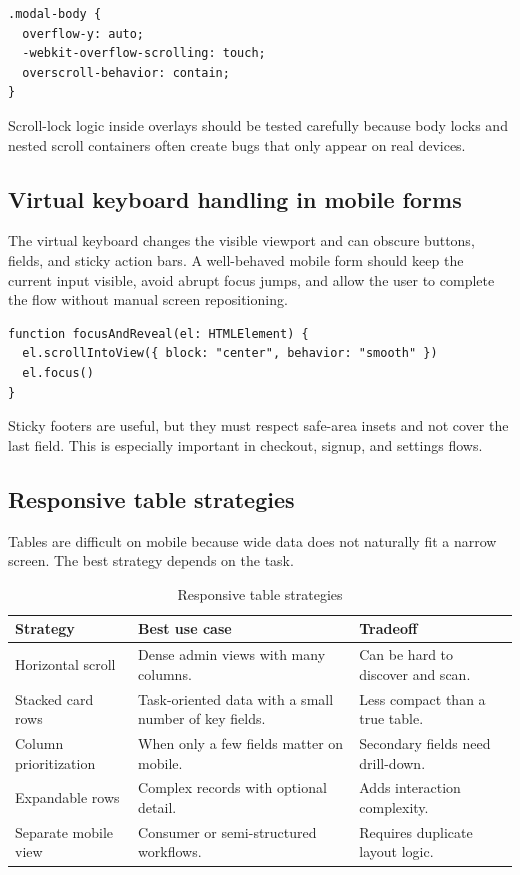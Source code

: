\begin{verbatim}
.modal-body {
  overflow-y: auto;
  -webkit-overflow-scrolling: touch;
  overscroll-behavior: contain;
}
\end{verbatim}

Scroll-lock logic inside overlays should be tested carefully because body locks and nested scroll containers often create bugs that only appear on real devices.

\subsection{Virtual keyboard handling in mobile forms}
The virtual keyboard changes the visible viewport and can obscure buttons, fields, and sticky action bars. A well-behaved mobile form should keep the current input visible, avoid abrupt focus jumps, and allow the user to complete the flow without manual screen repositioning.

\begin{verbatim}
function focusAndReveal(el: HTMLElement) {
  el.scrollIntoView({ block: "center", behavior: "smooth" })
  el.focus()
}
\end{verbatim}

Sticky footers are useful, but they must respect safe-area insets and not cover the last field. This is especially important in checkout, signup, and settings flows.

\subsection{Responsive table strategies}
Tables are difficult on mobile because wide data does not naturally fit a narrow screen. The best strategy depends on the task.

\begin{table}[htbp]
  \centering
  \caption{Responsive table strategies}
  \begin{tabularx}{\textwidth}{@{}p{}p{}Y@{}}
    \toprule
    \textbf{Strategy} & \textbf{Best use case} & \textbf{Tradeoff} \\
    \midrule
    Horizontal scroll & Dense admin views with many columns. & Can be hard to discover and scan. \\
    Stacked card rows & Task-oriented data with a small number of key fields. & Less compact than a true table. \\
    Column prioritization & When only a few fields matter on mobile. & Secondary fields need drill-down. \\
    Expandable rows & Complex records with optional detail. & Adds interaction complexity. \\
    Separate mobile view & Consumer or semi-structured workflows. & Requires duplicate layout logic. \\
    \bottomrule
  \end{tabularx}
\end{table}

